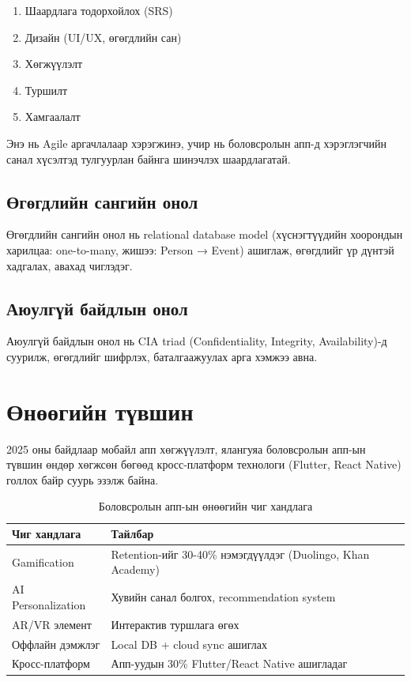\begin{enumerate}
	\item Шаардлага тодорхойлох (SRS)
	\item Дизайн (UI/UX, өгөгдлийн сан)
	\item Хөгжүүлэлт
	\item Туршилт
	\item Хамгаалалт
\end{enumerate}

Энэ нь Agile аргачлалаар хэрэгжинэ, учир нь боловсролын апп-д хэрэглэгчийн санал хүсэлтэд тулгуурлан байнга шинэчлэх шаардлагатай.

\subsection{Өгөгдлийн сангийн онол}

Өгөгдлийн сангийн онол нь relational database model (хүснэгтүүдийн хоорондын харилцаа: one-to-many, жишээ: Person → Event) ашиглаж, өгөгдлийг үр дүнтэй хадгалах, авахад чиглэдэг.

\subsection{Аюулгүй байдлын онол}

Аюулгүй байдлын онол нь CIA triad (Confidentiality, Integrity, Availability)-д суурилж, өгөгдлийг шифрлэх, баталгаажуулах арга хэмжээ авна.

\section{Өнөөгийн түвшин}

2025 оны байдлаар мобайл апп хөгжүүлэлт, ялангуяа боловсролын апп-ын түвшин өндөр хөгжсөн бөгөөд кросс-платформ технологи (Flutter, React Native) голлох байр суурь эзэлж байна.

\begin{table}[h]
\centering
\begin{tabular}{|p{4cm}|p{9cm}|}
\hline
\textbf{Чиг хандлага} & \textbf{Тайлбар} \\
\hline
Gamification & Retention-ийг 30-40\% нэмэгдүүлдэг (Duolingo, Khan Academy) \\
\hline
AI Personalization & Хувийн санал болгох, recommendation system \\
\hline
AR/VR элемент & Интерактив туршлага өгөх \\
\hline
Оффлайн дэмжлэг & Local DB + cloud sync ашиглах \\
\hline
Кросс-платформ & Апп-уудын 30\% Flutter/React Native ашигладаг \\
\hline
\end{tabular}
\caption{Боловсролын апп-ын өнөөгийн чиг хандлага}
\label{tab:trends}
\end{table}

